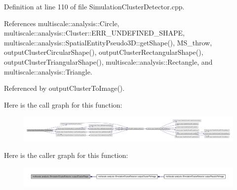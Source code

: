 \-Definition at line 110 of file \-Simulation\-Cluster\-Detector.\-cpp.



\-References multiscale\-::analysis\-::\-Circle, multiscale\-::analysis\-::\-Cluster\-::\-E\-R\-R\-\_\-\-U\-N\-D\-E\-F\-I\-N\-E\-D\-\_\-\-S\-H\-A\-P\-E, multiscale\-::analysis\-::\-Spatial\-Entity\-Pseudo3\-D\-::get\-Shape(), \-M\-S\-\_\-throw, output\-Cluster\-Circular\-Shape(), output\-Cluster\-Rectangular\-Shape(), output\-Cluster\-Triangular\-Shape(), multiscale\-::analysis\-::\-Rectangle, and multiscale\-::analysis\-::\-Triangle.



\-Referenced by output\-Cluster\-To\-Image().



\-Here is the call graph for this function\-:\nopagebreak
\begin{figure}[H]
\begin{center}
\leavevmode
\includegraphics[width=350pt]{classmultiscale_1_1analysis_1_1SimulationClusterDetector_a8dc451d799404ba7ecd72d85d2f7e955_cgraph}
\end{center}
\end{figure}




\-Here is the caller graph for this function\-:\nopagebreak
\begin{figure}[H]
\begin{center}
\leavevmode
\includegraphics[width=350pt]{classmultiscale_1_1analysis_1_1SimulationClusterDetector_a8dc451d799404ba7ecd72d85d2f7e955_icgraph}
\end{center}
\end{figure}


